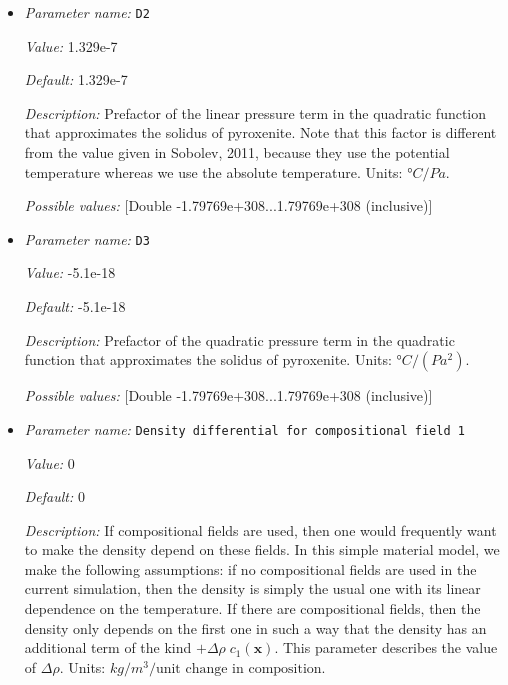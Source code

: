 \begin{itemize}
{\it Value:} 976.0


{\it Default:} 976.0


{\it Description:} Constant parameter in the quadratic function that approximates the solidus of pyroxenite. Units: $°C$.


{\it Possible values:} [Double -1.79769e+308...1.79769e+308 (inclusive)]
\item {\it Parameter name:} {\tt D2}
\label{parameters:Material model/Latent heat melt/D2}


{\it Value:} 1.329e-7


{\it Default:} 1.329e-7


{\it Description:} Prefactor of the linear pressure term in the quadratic function that approximates the solidus of pyroxenite. Note that this factor is different from the value given in Sobolev, 2011, because they use the potential temperature whereas we use the absolute temperature. Units: $°C/Pa$.


{\it Possible values:} [Double -1.79769e+308...1.79769e+308 (inclusive)]
\item {\it Parameter name:} {\tt D3}
\label{parameters:Material model/Latent heat melt/D3}


{\it Value:} -5.1e-18


{\it Default:} -5.1e-18


{\it Description:} Prefactor of the quadratic pressure term in the quadratic function that approximates the solidus of pyroxenite. Units: $°C/(Pa^2)$.


{\it Possible values:} [Double -1.79769e+308...1.79769e+308 (inclusive)]
\item {\it Parameter name:} {\tt Density differential for compositional field 1}
\label{parameters:Material model/Latent heat melt/Density differential for compositional field 1}


{\it Value:} 0


{\it Default:} 0


{\it Description:} If compositional fields are used, then one would frequently want to make the density depend on these fields. In this simple material model, we make the following assumptions: if no compositional fields are used in the current simulation, then the density is simply the usual one with its linear dependence on the temperature. If there are compositional fields, then the density only depends on the first one in such a way that the density has an additional term of the kind $+\Delta \rho \; c_1(\mathbf x)$. This parameter describes the value of $\Delta \rho$. Units: $kg/m^3/\textrm{unit change in composition}$.



\end{itemize}
